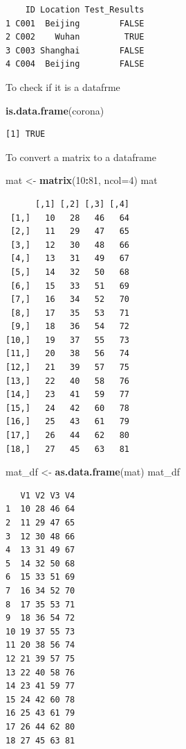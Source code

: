 \documentclass[
]{book}
\newenvironment{Shaded}{\begin{snugshade}}{\end{snugshade}}
\newcommand{\DataTypeTok}[1]{\textcolor[rgb]{0.13,0.29,0.53}{#1}}
\newcommand{\DecValTok}[1]{\textcolor[rgb]{0.00,0.00,0.81}{#1}}
\newcommand{\KeywordTok}[1]{\textcolor[rgb]{0.13,0.29,0.53}{\textbf{#1}}}
\newcommand{\NormalTok}[1]{#1}
\newcommand{\OperatorTok}[1]{\textcolor[rgb]{0.81,0.36,0.00}{\textbf{#1}}}
\newcommand{\StringTok}[1]{\textcolor[rgb]{0.31,0.60,0.02}{#1}}
\begin{document}
\begin{verbatim}
    ID Location Test_Results
1 C001  Beijing        FALSE
2 C002    Wuhan         TRUE
3 C003 Shanghai        FALSE
4 C004  Beijing        FALSE
\end{verbatim}

To check if it is a datafrme

\begin{Shaded}
\begin{Highlighting}[]
\KeywordTok{is.data.frame}\NormalTok{(corona)}
\end{Highlighting}
\end{Shaded}

\begin{verbatim}
[1] TRUE
\end{verbatim}

To convert a matrix to a dataframe

\begin{Shaded}
\begin{Highlighting}[]
\NormalTok{mat <-}\StringTok{ }\KeywordTok{matrix}\NormalTok{(}\DecValTok{10}\OperatorTok{:}\DecValTok{81}\NormalTok{, }\DataTypeTok{ncol=}\DecValTok{4}\NormalTok{)}
\NormalTok{mat}
\end{Highlighting}
\end{Shaded}

\begin{verbatim}
      [,1] [,2] [,3] [,4]
 [1,]   10   28   46   64
 [2,]   11   29   47   65
 [3,]   12   30   48   66
 [4,]   13   31   49   67
 [5,]   14   32   50   68
 [6,]   15   33   51   69
 [7,]   16   34   52   70
 [8,]   17   35   53   71
 [9,]   18   36   54   72
[10,]   19   37   55   73
[11,]   20   38   56   74
[12,]   21   39   57   75
[13,]   22   40   58   76
[14,]   23   41   59   77
[15,]   24   42   60   78
[16,]   25   43   61   79
[17,]   26   44   62   80
[18,]   27   45   63   81
\end{verbatim}

\begin{Shaded}
\begin{Highlighting}[]
\NormalTok{mat_df <-}\StringTok{ }\KeywordTok{as.data.frame}\NormalTok{(mat)}
\NormalTok{mat_df}
\end{Highlighting}
\end{Shaded}

\begin{verbatim}
   V1 V2 V3 V4
1  10 28 46 64
2  11 29 47 65
3  12 30 48 66
4  13 31 49 67
5  14 32 50 68
6  15 33 51 69
7  16 34 52 70
8  17 35 53 71
9  18 36 54 72
10 19 37 55 73
11 20 38 56 74
12 21 39 57 75
13 22 40 58 76
14 23 41 59 77
15 24 42 60 78
16 25 43 61 79
17 26 44 62 80
18 27 45 63 81
\end{verbatim}
\end{document}

